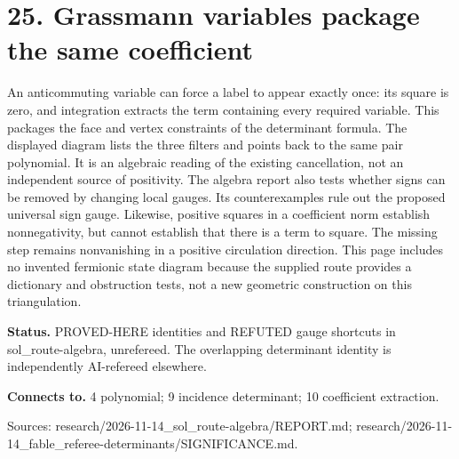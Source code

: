 \documentclass[10pt,a4paper]{amsart}
\begin{document}
\section*{25. Grassmann variables package the same coefficient}
\begin{center}\begin{minipage}{.86\textwidth}\centering
{}
\end{minipage}\end{center}
An anticommuting variable can force a label to appear exactly once: its square is zero, and integration extracts the term containing every required variable. This packages the face and vertex constraints of the determinant formula. The displayed diagram lists the three filters and points back to the same pair polynomial. It is an algebraic reading of the existing cancellation, not an independent source of positivity. The algebra report also tests whether signs can be removed by changing local gauges. Its counterexamples rule out the proposed universal sign gauge. Likewise, positive squares in a coefficient norm establish nonnegativity, but cannot establish that there is a term to square. The missing step remains nonvanishing in a positive circulation direction. This page includes no invented fermionic state diagram because the supplied route provides a dictionary and obstruction tests, not a new geometric construction on this triangulation.

\textbf{Status.} PROVED-HERE identities and REFUTED gauge shortcuts in sol\_route-algebra, unrefereed. The overlapping determinant identity is independently AI-refereed elsewhere.

\textbf{Connects to.} 4 polynomial; 9 incidence determinant; 10 coefficient extraction.

{\footnotesize\raggedright Sources: research/\allowbreak{}2026-11-14\_sol\_route-algebra/\allowbreak{}REPORT.md;\allowbreak{} research/\allowbreak{}2026-11-14\_fable\_referee-determinants/\allowbreak{}SIGNIFICANCE.md.\par}
\end{document}
